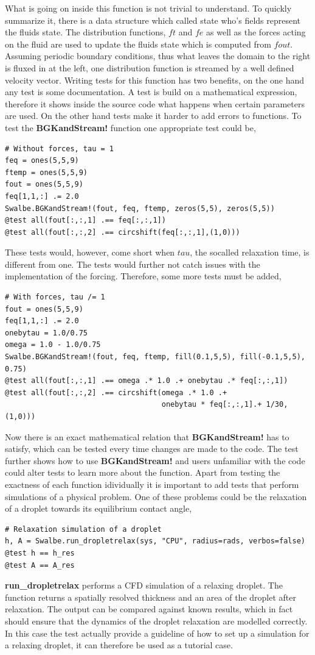 What is going on inside this function is not trivial to understand.
To quickly summarize it, there is a data structure which called state who's fields represent the fluids state.
The distribution functions, $ft$ and $fe$ as well as the forces acting on the fluid are used to update the fluids state which is computed from $fout$.
Assuming periodic boundary conditions, thus what leaves the domain to the right is fluxed in at the left, one distribution function is streamed by a well defined velocity vector.
Writing tests for this function has two benefits, on the one hand any test is some documentation.
A test is build on a mathematical expression, therefore it shows inside the source code what happens when certain parameters are used.
On the other hand tests make it harder to add errors to functions.
To test the \textbf{BGKandStream!} function one appropriate test could be,
\begin{verbatim}
# Without forces, tau = 1  
feq = ones(5,5,9)
ftemp = ones(5,5,9)
fout = ones(5,5,9)
feq[1,1,:] .= 2.0
Swalbe.BGKandStream!(fout, feq, ftemp, zeros(5,5), zeros(5,5))
@test all(fout[:,:,1] .== feq[:,:,1])
@test all(fout[:,:,2] .== circshift(feq[:,:,1],(1,0)))
\end{verbatim}
These tests would, however, come short when $tau$, the socalled relaxation time, is different from one.
The tests would further not catch issues with the implementation of the forcing.
Therefore, some more tests must be added,
\begin{verbatim}
# With forces, tau /= 1
fout = ones(5,5,9)
feq[1,1,:] .= 2.0
onebytau = 1.0/0.75
omega = 1.0 - 1.0/0.75
Swalbe.BGKandStream!(fout, feq, ftemp, fill(0.1,5,5), fill(-0.1,5,5), 0.75)
@test all(fout[:,:,1] .== omega .* 1.0 .+ onebytau .* feq[:,:,1])
@test all(fout[:,:,2] .== circshift(omega .* 1.0 .+ 
                                    onebytau * feq[:,:,1].+ 1/30,(1,0)))
\end{verbatim}
Now there is an exact mathematical relation that \textbf{BGKandStream!} has to satisfy, which can be tested every time changes are made to the code.
The test further shows how to use \textbf{BGKandStream!} and users unfamiliar with the code could alter tests to learn more about the function.
Apart from testing the exactness of each function idividually it is important to add tests that perform simulations of a physical problem.
One of these problems could be the relaxation of a droplet towards its equilibrium contact angle,
\begin{verbatim}
# Relaxation simulation of a droplet
h, A = Swalbe.run_dropletrelax(sys, "CPU", radius=rads, verbos=false)
@test h == h_res
@test A == A_res
\end{verbatim}
\textbf{run\_dropletrelax} performs a CFD simulation of a relaxing droplet.
The function returns a spatially resolved thickness and an area of the droplet after relaxation.
The output can be compared against known results, which in fact should ensure that the dynamics of the droplet relaxation are modelled correctly. 
In this case the test actually provide a guideline of how to set up a simulation for a relaxing droplet, it can therefore be used as a tutorial case.

